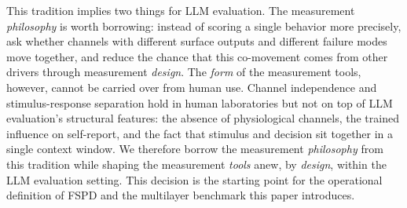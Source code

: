 This tradition implies two things for LLM evaluation. The measurement \emph{philosophy} is worth borrowing: instead of scoring a single behavior more precisely, ask whether channels with different surface outputs and different failure modes move together, and reduce the chance that this co-movement comes from other drivers through measurement \emph{design}. The \emph{form} of the measurement tools, however, cannot be carried over from human use. Channel independence and stimulus-response separation hold in human laboratories but not on top of LLM evaluation's structural features: the absence of physiological channels, the trained influence on self-report, and the fact that stimulus and decision sit together in a single context window. We therefore borrow the measurement \emph{philosophy} from this tradition while shaping the measurement \emph{tools} anew, by \emph{design}, within the LLM evaluation setting. This decision is the starting point for the operational definition of FSPD and the multilayer benchmark this paper introduces.